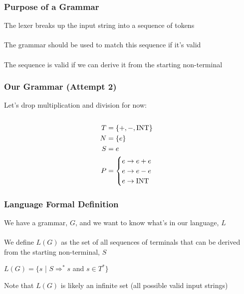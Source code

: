\documentclass[aspectratio=169]{beamer}
\begin{document}
\begin{frame}
\frametitle{Purpose of a Grammar}

The lexer breaks up the input string into a sequence of \alert{tokens}\\~\\

The grammar should be used to match this sequence if it's valid\\~\\

The sequence is valid if we can derive it from the \alert{starting non-terminal}
\end{frame}

\begin{frame}[fragile]
\frametitle{Our Grammar (Attempt 2)}

Let's drop multiplication and division for now:\\~\\

\begin{align*}
T &= \{ +, -, \text{\lstinline{INT}} \}\\
N &= \{ e \}\\
S &= e\\
P &= \begin{cases}e \rightarrow e + e \\
     e \rightarrow e - e\\
     e \rightarrow \text{\lstinline{INT}}\end{cases}
\end{align*}
\end{frame}

\begin{frame}
\frametitle{Language Formal Definition}

We have a \alert{grammar}, $G$, and we want to know what's in our
\alert{language}, $L$\\~\\

We define $L(G)$ as the set of all sequences of terminals that can be derived
from the \alert{starting non-terminal}, $S$

\begin{center}
$L(G) = \{ s$ | $S \Rightarrow^* s$ and $s \in T^* \}$ 
\end{center}

Note that $L(G)$ is likely an infinite set (all possible valid input strings)
\end{frame}
\end{document}
